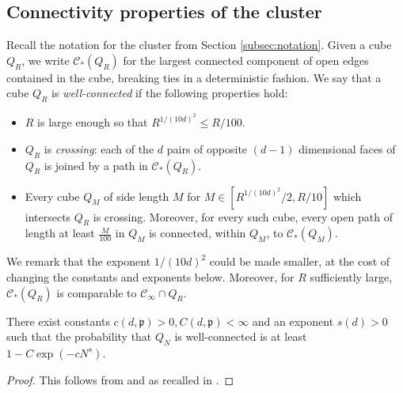 \documentclass[12pt]{amsart}
\numberwithin{equation}{section}
\begin{document}
	\subsection{Connectivity properties of the cluster} \label{subsec:percolation-properties}
	Recall the notation for the cluster from Section \ref{subsec:notation}. Given a cube $Q_R$, we write $\mathscr{C}_*(Q_R)$ for the largest connected component of open edges contained in the cube, 
	breaking ties in a deterministic fashion. We say that a cube $Q_R$ is {\it well-connected} if the following properties hold:
	\begin{itemize}
		\item $R$ is large enough so that $R^{1/(10 d)^2} \leq  R/100$.
		\item $Q_R$ is {\it crossing}: each of the $d$ pairs of opposite $(d-1)$ dimensional faces of $Q_R$ is joined by a path in $\mathscr{C}_*(Q_R)$.
		\item Every cube $Q_M$ of side length $M$ for $M \in [R^{1/(10 d)^2}/2, R/10]$ which intersects $Q_R$ is crossing. Moreover, for every such cube, every open path of length at least $\frac{M}{100}$ in $Q_M$ is connected, within $Q_M$, to $\mathscr{C}_*(Q_M)$.
	\end{itemize}
	We remark that the exponent $1/(10 d)^2$ could be made smaller, at the cost of changing the constants and exponents below.
	Moreover, for $R$ sufficiently large, $\mathscr{C}_*(Q_R)$ is comparable to $\mathscr{C}_{\infty} \cap Q_R$.
	\begin{prop} \label{prop:well-connected}
		There exist constants $c(d, \mathfrak{p}) > 0,C(d, \mathfrak{p}) < \infty$ and an exponent $s(d) > 0$ such that the probability that $Q_N$ is well-connected
		is at least $1 - C \exp(-c N^s)$. 
	\end{prop}
	\begin{proof}
		This follows from \cite[Theorem 3.2]{pisztora-percolation} and \cite[Theorem 5]{penrose-pisztora-1996} as recalled in \cite[Equation (2.24)]{antal-pisztora-chemical}.
	\end{proof}
	
	
	
	
	
\end{document}
